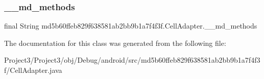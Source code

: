 \subsubsection{\texorpdfstring{\+\_\+\+\_\+md\+\_\+methods}{\_\_md\_methods}}
{\footnotesize\ttfamily final String md5b60ffeb829f638581ab2bb9b1a7f4f3f.\+Cell\+Adapter.\+\_\+\+\_\+md\+\_\+methods\hspace{0.3cm}{\ttfamily [static]}}



The documentation for this class was generated from the following file\+:\begin{DoxyCompactItemize}
\item 
Project3/\+Project3/obj/\+Debug/android/src/md5b60ffeb829f638581ab2bb9b1a7f4f3f/Cell\+Adapter.\+java\end{DoxyCompactItemize}
